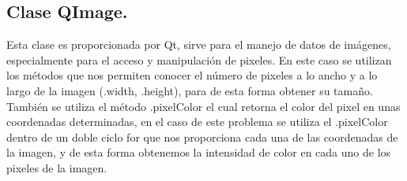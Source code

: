 \documentclass{article}
\begin{document}
\subsection{Clase QImage.}
Esta clase es proporcionada por Qt, sirve para el manejo de datos de imágenes, especialmente para el acceso y manipulación de pixeles. En este caso se utilizan los métodos que nos permiten conocer el número de pixeles a lo ancho y a lo largo de la imagen (.width, .height), para de esta forma obtener su tamaño. También se utiliza el método .pixelColor el cual retorna el color del pixel en unas coordenadas determinadas, en el caso de este problema se utiliza el .pixelColor dentro de un doble ciclo for que nos proporciona cada una de las coordenadas de la imagen, y de esta forma obtenemos la intensidad de color en cada uno de los pixeles de la imagen.
\end{document}
